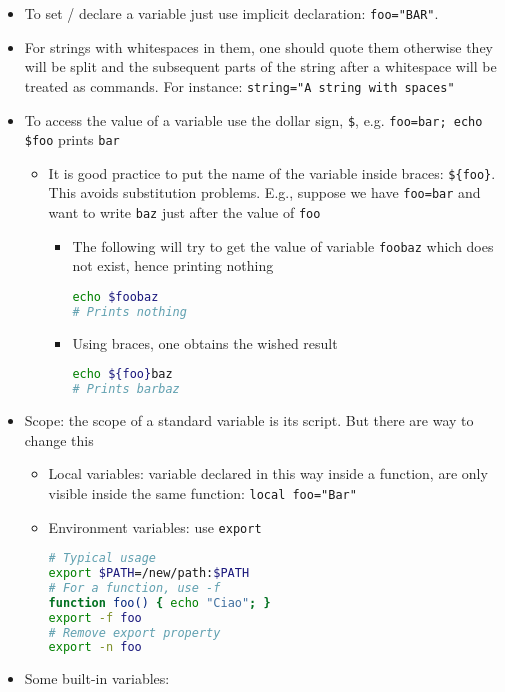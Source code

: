 \documentclass[a4paper,12pt,%
              final%
              ]{article}
\begin{document}
\begin{itemize}
\begin{itemize}
      \item To set / declare a variable just use implicit declaration: \verb|foo="BAR"|.
      \item For strings with whitespaces in them, one should quote them otherwise they will be split and the subsequent parts of the string after a whitespace will be treated as commands. For instance: \verb|string="A string with spaces"|
      \item To access the value of a variable use the dollar sign, \verb|$|, e.g. \verb|foo=bar; echo $foo| prints \texttt{bar}
        \begin{itemize}
          \item It is good practice to put the name of the variable inside braces: \verb|${foo}|. This avoids substitution problems. E.g., suppose we have \verb|foo=bar| and want to write \texttt{baz} just after the value of \texttt{foo}
            \begin{itemize}
              \item The following will try to get the value of variable \texttt{foobaz} which does not exist, hence printing nothing
\begin{lstlisting}[language=bash]
echo $foobaz
# Prints nothing
\end{lstlisting}
              \item Using braces, one obtains the wished result
\begin{lstlisting}[language=bash]
echo ${foo}baz
# Prints barbaz
\end{lstlisting}
            \end{itemize}
        \end{itemize}
      \item Scope: the scope of a standard variable is its script. But there are way to change this
        \begin{itemize}
          \item Local variables: variable declared in this way inside a function, are only visible inside the same function: \verb|local foo="Bar"|
          \item Environment variables: use \texttt{export}
\begin{lstlisting}[language=bash]
# Typical usage
export $PATH=/new/path:$PATH
# For a function, use -f
function foo() { echo "Ciao"; }
export -f foo
# Remove export property
export -n foo
\end{lstlisting}
        \end{itemize}
      \item Some built-in variables:

\end{itemize}
\end{itemize}
\end{document}
